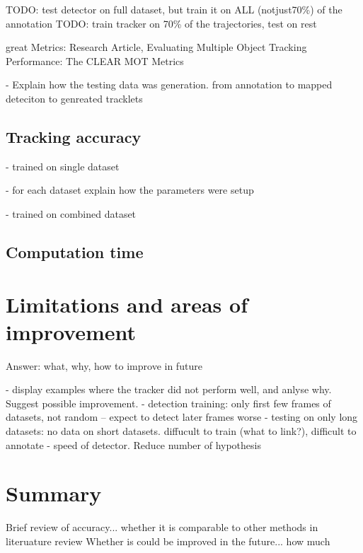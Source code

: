 	TODO: test detector on full dataset, but train it on ALL (notjust70\%) of the annotation
	TODO: train tracker on 70\% of the trajectories, test on rest
	
	great Metrics: Research Article, Evaluating Multiple Object Tracking Performance: The CLEAR MOT Metrics
	
	- Explain how the testing data was generation. from annotation to mapped deteciton to genreated tracklets

	\subsection{Tracking accuracy \statusnew}
		- trained on single dataset
		
		- for each dataset explain how the parameters were setup
					
		- trained on combined dataset
	\subsection{Computation time \statusnew}
\section{Limitations and areas of improvement \statusnew}
	\label{sec:results_limitations}
	Answer: what, why, how to improve in future
			
	- display examples where the tracker did not perform well, and anlyse why. Suggest possible improvement.
	- detection training: only first few frames of datasets, not random -- expect to detect later frames worse
	- testing on only long datasets: no data on short datasets. diffucult to train (what to link?), difficult to annotate
	- speed of detector. Reduce number of hypothesis		

\section{Summary \statusnew}
	\label{sec:results_summary}
	Brief review of accuracy... whether it is comparable to other methods in literuature review
	Whether is could be improved in the future... how much